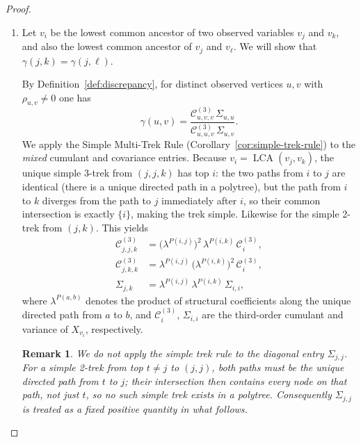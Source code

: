\documentclass[11pt,a4paper]{article}
\numberwithin{equation}{section}
\newtheorem*{remark*}{Remark}
\begin{document}
\begin{proof}
\begin{enumerate}[label=(\arabic*)]
Under the \emph{generic parameters} assumption
(Definition~\ref{def:generic}),
equation~\eqref{eq:axiom1_key} cannot hold when $h\ne i$.
This forces $h = i$, i.e.\ $\operatorname{LCA}(i,j) = i$,
meaning $i$ is an ancestor of $j$.

  \item Let $v_i$ be the lowest common ancestor of two observed variables $v_j$
and $v_k$, and also the lowest common ancestor of $v_j$ and $v_\ell$.
We will show that $\gamma(j,k) = \gamma(j,\ell)$.

By Definition~\ref{def:discrepancy}, for distinct observed vertices $u,v$
with $\rho_{u,v}\neq 0$ one has
\[
  \gamma(u,v)
  = \frac{\mathcal{C}^{(3)}_{u,v,v}\,\Sigma_{u,u}}
         {\mathcal{C}^{(3)}_{u,u,v}\,\Sigma_{u,v}}.
\]
We apply the Simple Multi-Trek Rule (Corollary~\ref{cor:simple-trek-rule})
to the \emph{mixed} cumulant and covariance entries.  Because
$v_i = \operatorname{LCA}(v_j, v_k)$, the unique simple $3$-trek from
$(j,j,k)$ has top $i$: the two paths from $i$ to $j$ are identical (there
is a unique directed path in a polytree), but the path from $i$ to $k$
diverges from the path to $j$ immediately after $i$, so their common
intersection is exactly $\{i\}$, making the trek simple.  Likewise for
the simple 2-trek from $(j,k)$.  This yields
\begin{align*}
  \mathcal{C}^{(3)}_{j,j,k}
    &= \bigl(\lambda^{P(i,j)}\bigr)^2\,\lambda^{P(i,k)}\,\mathcal{C}^{(3)}_{i},
  \\
  \mathcal{C}^{(3)}_{j,k,k}
    &= \lambda^{P(i,j)}\,\bigl(\lambda^{P(i,k)}\bigr)^2\,\mathcal{C}^{(3)}_{i},
  \\
  \Sigma_{j,k}
    &= \lambda^{P(i,j)}\,\lambda^{P(i,k)}\,\Sigma_{i,i},
\end{align*}
where $\lambda^{P(a,b)}$ denotes the product of structural coefficients
along the unique directed path from $a$ to $b$, and
$\mathcal{C}^{(3)}_i$, $\Sigma_{i,i}$ are the third-order cumulant and
variance of $X_{v_i}$, respectively.

\begin{remark*}
We do \emph{not} apply the simple trek rule to the diagonal entry
$\Sigma_{j,j}$.  For a simple 2-trek from top $t\neq j$ to $(j,j)$, both
paths must be the unique directed path from $t$ to $j$; their intersection
then contains every node on that path, not just $t$, so no such simple trek
exists in a polytree.  Consequently $\Sigma_{j,j}$ is treated as a fixed
positive quantity in what follows.
\end{remark*}


\end{enumerate}
\end{proof}
\end{document}
